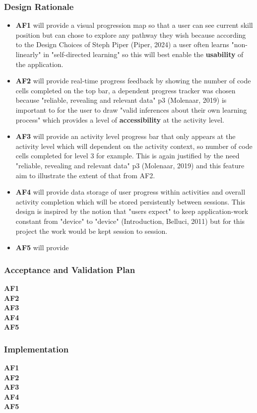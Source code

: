 \documentclass{article}
\begin{document}
\subsubsection{Design Rationale}
\begin{itemize}
\item \textbf{AF1} will provide a visual progression map so that a user can see current skill position but can chose to explore any pathway they wish because according to the Design Choices of Steph Piper (Piper, 2024) a user often learns "non-linearly" in "self-directed learning" so this will best enable the \textbf{usability} of the application.
\item \textbf{AF2} will provide real-time progress feedback by showing the number of code cells completed on the top bar, a dependent progress tracker was chosen because "reliable, revealing and relevant data" p3 (Molenaar, 2019) is important to for the user to draw "valid inferences about their own learning process" which provides a level of \textbf{accessibility} at the activity level.
\item \textbf{AF3} will provide an activity level progress bar that only appears at the activity level which will dependent on the activity context, so number of code cells completed for level 3 for example. This is again justified by the need "reliable, revealing and relevant data" p3 (Molenaar, 2019) and this feature aim to illustrate the extent of that from AF2. 
\item \textbf{AF4} will provide data storage of user progress within activities and overall activity completion which will be stored persistently between sessions. This design is inspired by the notion that "users expect" to keep application-work constant from "device" to "device" (Introduction, Belluci, 2011) but for this project the work would be kept session to session.
\item \textbf{AF5} will provide
\end{itemize}
\subsubsection{Acceptance and Validation Plan}
\textbf{AF1} \mbox{} \\
\textbf{AF2} \mbox{} \\
\textbf{AF3} \mbox{} \\
\textbf{AF4} \mbox{} \\
\textbf{AF5} \mbox{} \\

\subsubsection{Implementation}
\textbf{AF1} \mbox{} \\
\textbf{AF2} \mbox{} \\
\textbf{AF3} \mbox{} \\
\textbf{AF4} \mbox{} \\
\textbf{AF5} \mbox{} \\
\end{document}
